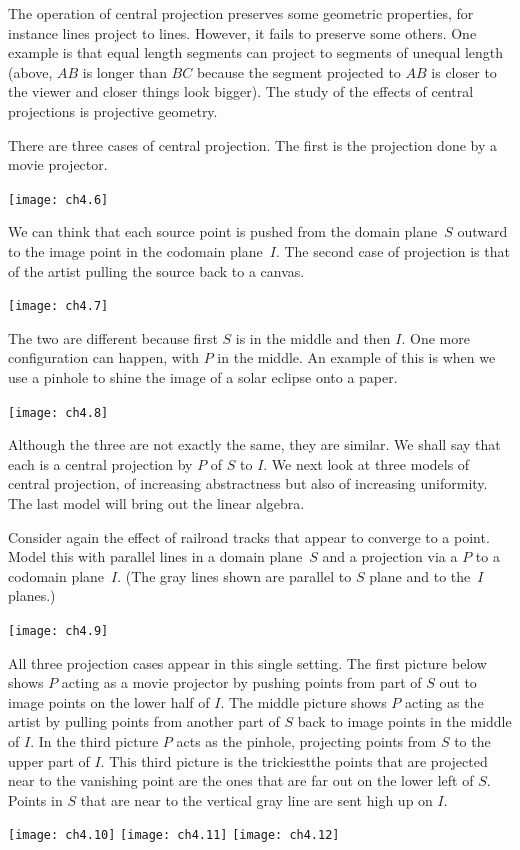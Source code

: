 The operation of  
central projection preserves some geometric 
properties, for instance lines project to lines.
However, it fails to preserve some others.
One example is that equal 
length segments can project to segments of unequal length 
(above, $AB$ is longer than $BC$ because the
segment projected to $AB$ is closer to the viewer and 
closer things look bigger).
The study of the effects of central projections is projective geometry.

There are three cases of central projection.
The first is the projection done by a movie projector.
\begin{center}
  \texttt{[image: ch4.6]}
\end{center}
We can think that each source point is pushed from the domain plane~$S$
outward to the image point in the codomain plane~$I$.
The second case of projection is that of the artist
pulling the source back to a canvas.
\begin{center}
  \texttt{[image: ch4.7]}
\end{center}
The two are different because first $S$ is in the middle
and then $I$.
One more configuration can happen, with $P$ in the middle. 
An example of this is when we use a pinhole to shine the 
image of a solar eclipse onto a paper.
\begin{center}
  \texttt{[image: ch4.8]}
\end{center}

Although the three are not exactly the same,  
they are similar.
We shall say that 
each is a central projection by $P$ of
$S$ to $I$.
We next look at three models of central projection, 
of increasing abstractness but
also of increasing uniformity.
The last model will bring out the linear algebra.

Consider again the effect of railroad tracks  
that appear to converge to a point.
Model this with parallel lines in a domain plane~$S$
and a projection via a $P$ to a codomain plane~$I$. 
(The gray lines shown are parallel to $S$ plane and to the~$I$ planes.)
\begin{center}
  \texttt{[image: ch4.9]}
\end{center}
All three projection cases appear in this single setting.
The first picture below shows $P$ acting as a movie projector by pushing
points from part of $S$ out to image points on the lower half of $I$.
The middle picture shows $P$ acting as the artist by 
pulling points from another part of $S$ back to  
image points in the middle of $I$.
In the third picture $P$ acts as the pinhole, projecting points from $S$
to the upper part of $I$.
This third picture is the trickiest\Dash the points that are
projected near to the vanishing point are the ones that are 
far out on the lower left of $S$. 
Points in $S$ that are near to the vertical gray line
are sent high up on $I$.
\begin{center}
  \texttt{[image: ch4.10]}
\hfil
  \texttt{[image: ch4.11]}
\hfil
  \texttt{[image: ch4.12]}
\end{center}

